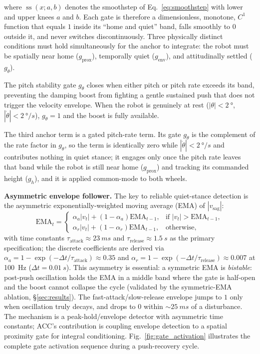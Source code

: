 \documentclass[conference]{IEEEtran}
\begin{document}
where $\operatorname{ss}(x;a,b)$ denotes the smoothstep of Eq.~\eqref{eq:smoothstep} with lower and upper knees $a$ and $b$.
Each gate is therefore a dimensionless, monotone, $C^1$ function that equals $1$ inside its ``home and quiet'' band, falls smoothly to $0$ outside it, and never switches discontinuously.
Three physically distinct conditions must hold simultaneously for the anchor to integrate: the robot must be spatially near home ($g_{\text{prox}}$), temporally quiet ($g_{\text{env}}$), and attitudinally settled ($g_\theta$).

The pitch stability gate $g_\theta$ closes when either pitch or pitch rate exceeds its band, preventing the damping boost from fighting a gentle sustained push that does not trigger the velocity envelope.
When the robot is genuinely at rest ($|\theta|<\SI{2}{\degree}$, $|\dot{\theta}|<\SI{2}{\degree/s}$), $g_\theta=1$ and the boost is fully available.

The third anchor term is a gated pitch-rate term. Its gate $g_{\dot{\theta}}$ is the complement of the rate factor in $g_\theta$, so the term is identically zero while $|\dot{\theta}|<\SI{2}{\degree/s}$ and contributes nothing in quiet stance; it engages only once the pitch rate leaves that band while the robot is still near home ($g_{\text{prox}}$) and tracking its commanded height ($g_h$), and it is applied common-mode to both wheels.

\textbf{Asymmetric envelope follower.}
The key to reliable quiet-stance detection is the asymmetric exponentially-weighted moving average (EMA) of $|v_{\text{sag}}|$:
\begin{equation}
\text{EMA}_t = \begin{cases}
\alpha_a|v_t| + (1{-}\alpha_a)\text{EMA}_{t-1}, & \text{if } |v_t| > \text{EMA}_{t-1},\\
\alpha_r|v_t| + (1{-}\alpha_r)\text{EMA}_{t-1}, & \text{otherwise},
\end{cases}
\label{eq:asym_ema}
\end{equation}
with time constants $\tau_{\text{attack}}{\approx}\SI{23}{ms}$ and $\tau_{\text{release}}{\approx}\SI{1.5}{s}$ as the primary specification; the discrete coefficients are derived via $\alpha_a=1-\exp(-\Delta t / \tau_{\text{attack}})\approx 0.35$ and $\alpha_r=1-\exp(-\Delta t / \tau_{\text{release}})\approx 0.007$ at \SI{100}{Hz} ($\Delta t{=}\SI{0.01}{s}$).
This asymmetry is essential: a symmetric EMA is \emph{bistable}: post-push oscillation holds the EMA in a middle band where the gate is half-open and the boost cannot collapse the cycle (validated by the symmetric-EMA ablation, \S\ref{sec:results}).
The fast-attack/slow-release envelope jumps to $1$ only when oscillation truly decays, and drops to $0$ within $\sim\SI{25}{ms}$ of a disturbance. The mechanism is a peak-hold/envelope detector with asymmetric time constants; ACC's contribution is coupling envelope detection to a spatial proximity gate for integral conditioning. Fig.~\ref{fig:gate_activation} illustrates the complete gate activation sequence during a push-recovery cycle.
\end{document}
